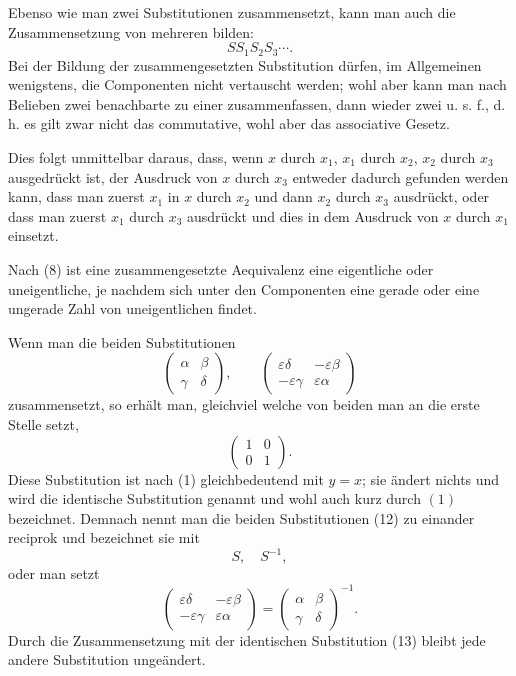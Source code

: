 \documentclass[11pt]{article}
\begin{document}
Ebenso wie man zwei Substitutionen zusammensetzt, kann man auch die Zusammensetzung von mehreren bilden:
\[
        SS_1S_2S_3\cdots.
\]
Bei der Bildung der zusammengesetzten Substitution dürfen, im Allgemeinen wenigstens, die Componenten nicht vertauscht werden; wohl aber kann man nach Belieben zwei benachbarte zu einer zusammenfassen, dann wieder zwei u. s. f., d. h. es gilt zwar nicht das commutative, wohl aber das associative Gesetz.

Dies folgt unmittelbar daraus, dass, wenn $x$ durch $x_1$, $x_1$ durch $x_2$, $x_2$ durch $x_3$ ausgedrückt ist, der Ausdruck von $x$ durch $x_3$ entweder dadurch gefunden werden kann, dass man zuerst $x_1$ in $x$ durch $x_2$ und dann $x_2$ durch $x_3$ ausdrückt, oder dass man zuerst $x_1$ durch $x_3$ ausdrückt und dies in dem Ausdruck von $x$ durch $x_1$ einsetzt.

Nach (8) ist eine zusammengesetzte Aequivalenz eine eigentliche oder uneigentliche, je nachdem sich unter den Componenten eine gerade oder eine ungerade Zahl von uneigentlichen findet.

Wenn man die beiden Substitutionen
\[
\tag{12}       \begin{pmatrix}\alpha&\beta\\ \gamma&\delta\end{pmatrix},
               \qquad
               \begin{pmatrix}\varepsilon\delta&-\varepsilon\beta\\
                              -\varepsilon\gamma&\varepsilon\alpha\end{pmatrix}
\]
zusammensetzt, so erhält man, gleichviel welche von beiden man an die erste Stelle setzt,
\[
\tag{13}       \begin{pmatrix}1&0\\0&1\end{pmatrix}.
\]
Diese Substitution ist nach (1) gleichbedeutend mit $y=x$; sie ändert nichts und wird die identische Substitution genannt und wohl auch kurz durch $(1)$ bezeichnet. Demnach nennt man die beiden Substitutionen (12) zu einander reciprok und bezeichnet sie mit
\[
        S,\quad S^{-1},
\]
oder man setzt
\[
\tag{14}       \begin{pmatrix}\varepsilon\delta&-\varepsilon\beta\\
                              -\varepsilon\gamma&\varepsilon\alpha\end{pmatrix}
=\begin{pmatrix}\alpha&\beta\\ \gamma&\delta\end{pmatrix}^{-1}.
\]
Durch die Zusammensetzung mit der identischen Substitution (13) bleibt jede andere Substitution ungeändert.
\end{document}
